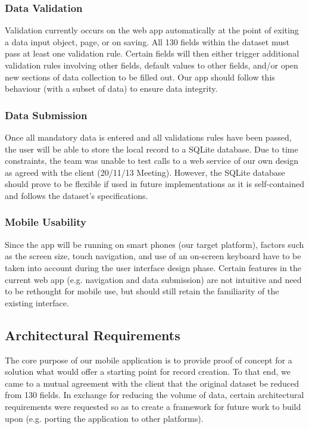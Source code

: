\documentclass[12pt,a4paper,oneside,titlepage]{article}
\begin{document}
\subsubsection{Data Validation}
Validation currently occurs on the web app automatically at the point of exiting a data input object, page, or on saving. All 130 fields within the dataset must pass at least one validation rule. Certain fields will then either trigger additional validation rules involving other fields, default values to other fields, and/or open new sections of data collection to be filled out. Our app should follow this behaviour (with a subset of data) to ensure data integrity.
\subsubsection{Data Submission}
Once all mandatory data is entered and all validations rules have been passed, the user will be able to store the local record to a SQLite database. Due to time constraints, the team was unable to test calls to a web service of our own design as agreed with the client (20/11/13 Meeting). However, the SQLite database should prove to be flexible if used in future implementations as it is self-contained and follows the dataset's specifications.
\subsubsection{Mobile Usability}
Since the app will be running on smart phones (our target platform), factors such as the screen size, touch navigation, and use of an on-screen keyboard have to be taken into account during the user interface design phase. Certain features in the current web app (e.g. navigation and data submission) are not intuitive and need to be rethought for mobile use, but should still retain the familiarity of the existing interface. 

\subsection{Architectural Requirements}
The core purpose of our mobile application is to provide proof of concept for a solution what would offer a starting point for record creation. To that end, we came to a mutual agreement with the client that the original dataset be reduced from 130 fields. In exchange for reducing the volume of data, certain architectural requirements were requested so as to create a framework for future work to build upon (e.g. porting the application to other platforms).
\end{document}
